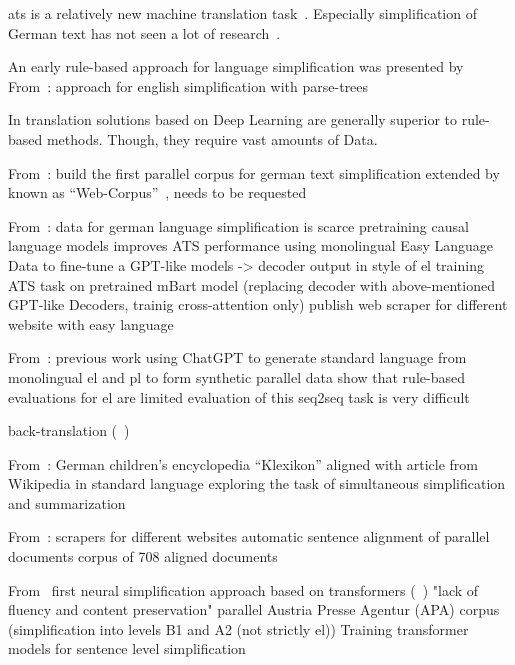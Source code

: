 \gls{ats} is a relatively new machine translation task~\autocite{schomacker2023data}.
Especially simplification of German text has not seen a lot of research~\autocite{Ansch_tz_2023}.

An early rule-based approach for language simplification was presented by~\autocite{suter2016}
From~\autocite{Garain2019}: approach for english simplification with parse-trees

In translation solutions based on Deep Learning are generally superior to rule-based methods.
Though, they require vast amounts of Data.~\autocite{otter2019survey}


From~\autocite{klaper-etal-2013-building}:
build the first parallel corpus for german text simplification
extended by ~\autocite{battisti-etal-2020-corpus}
known as \enquote{Web-Corpus}~\autocite{ebeling2022}, needs to be requested


From~\autocite{Ansch_tz_2023}:
data for german language simplification is scarce
pretraining causal language models improves ATS performance
using monolingual Easy Language Data to fine-tune a GPT-like models
-> decoder output in style of \gls{el}
training ATS task on pretrained mBart model (replacing decoder with above-mentioned GPT-like Decoders, trainig cross-attention only)
publish web scraper for different website with easy language

From~\autocite{klöser2024german}:
previous work
using ChatGPT to generate standard language from monolingual \gls{el} and \gls{pl} to form synthetic parallel data
show that rule-based evaluations for \gls{el} are limited
evaluation of this seq2seq task is very difficult

back-translation (~\autocite{sennrich-etal-2016-improving})

From~\autocite{aumiller2022klexikon}:
German children’s encyclopedia \enquote{Klexikon} aligned with article from Wikipedia in standard language
exploring the task of simultaneous simplification and summarization


From~\autocite{toborek2023new}:
scrapers for different websites
automatic sentence alignment of parallel documents
corpus of 708 aligned documents

From~\autocite{sauberli-etal-2020-benchmarking}
first neural simplification approach based on transformers (~\autocite{Ansch_tz_2023})
"lack of fluency and content preservation"
parallel Austria Presse Agentur (APA) corpus (simplification into levels B1 and A2 (not strictly \gls{el}))
Training transformer models for sentence level simplification


